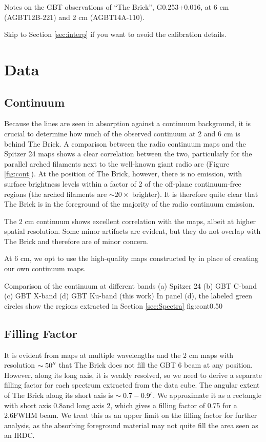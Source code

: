 

Notes on the GBT observations of ``The Brick'', G0.253+0.016, at 6 cm
(AGBT12B-221) and 2 cm (AGBT14A-110).


Skip to Section \ref{sec:interp} if you want to avoid the calibration details.

\section{Data}

\subsection{Continuum}
Because the \formaldehyde lines are seen in absorption against a continuum
background, it is crucial to determine how much of the observed continuum at 2
and 6 cm is behind The Brick.  A comparison between the radio continuum maps
and the Spitzer 24 \um maps \citep{Yusef-Zadeh2009a} shows a clear
correlation between the two, particularly for the parallel arched filaments
next to the well-known giant radio arc (Figure \ref{fig:cont}).  At the position of The Brick, however,
there is no emission, with surface brightness levels within a factor of 2 of
the off-plane continuum-free regions (the arched filaments are $\sim20\times$
brighter).  It is therefore quite clear that The Brick is in the foreground of
the majority of the radio continuum emission.

The 2 cm continuum shows excellent correlation with the \citet{Law2008a} maps,
albeit at higher spatial resolution.  Some minor artifacts are evident, but
they do not overlap with The Brick and therefore are of minor concern.

At 6 cm, we opt to use the high-quality maps constructed by \citet{Law2008a} in
place of creating our own continuum maps.

{Comparison of the continuum at different bands
(a) Spitzer 24 \um \citep{Yusef-Zadeh2009a}
(b) GBT C-band \citep{Law2008a}
(c) GBT X-band \citep{Law2008a}
(d) GBT Ku-band (this work)
In panel (d), the labeled green circles show the regions extracted in Section \ref{sec:Spectra}
}{fig:cont}{0.5}{0}

\subsection{Filling Factor}
\label{sec:fillingfactor}
It is evident from maps at multiple wavelengths and the 2 cm \formaldehyde maps
with resolution $\sim50\mbox{$^{\prime\prime}$}$ that The Brick does not fill the GBT 6 beam at
any position.  However, along its long axis, it is weakly resolved, so we need
to derive a separate filling factor for each spectrum extracted from the data
cube.  The angular extent of The Brick along its short axis is $\sim0.7-0.9
\mbox{$^\prime$}$.  We approximate it as a rectangle with short axis 0.8\arcmin and long
axis 2\arcmin, which gives a filling factor of 0.75 for a 2.6\arcmin FWHM beam.
We treat this as an upper limit on the filling factor for further analysis, as
the absorbing foreground material may not quite fill the area seen as an IRDC.

